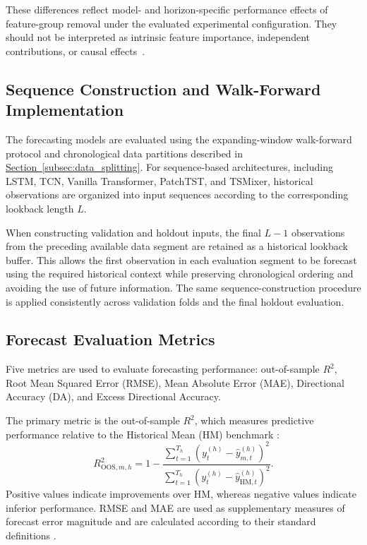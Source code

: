 \documentclass[runningheads,orivec]{llncs}
\begin{document}
These differences reflect model- and horizon-specific performance effects of feature-group removal under the evaluated experimental configuration. They should not be interpreted as intrinsic feature importance, independent contributions, or causal effects~\cite{hooker2021}.

\subsection{Sequence Construction and Walk-Forward Implementation}\label{subsec:walk_forward}

The forecasting models are evaluated using the expanding-window walk-forward protocol and chronological data partitions described in \hyperref[subsec:data_splitting]{Section~\ref*{subsec:data_splitting}}. For sequence-based architectures, including LSTM, TCN, Vanilla Transformer, PatchTST, and TSMixer, historical observations are organized into input sequences according to the corresponding lookback length $L$.

When constructing validation and holdout inputs, the final $L-1$ observations from the preceding available data segment are retained as a historical lookback buffer. This allows the first observation in each evaluation segment to be forecast using the required historical context while preserving chronological ordering and avoiding the use of future information. The same sequence-construction procedure is applied consistently across validation folds and the final holdout evaluation.

\subsection{Forecast Evaluation Metrics}\label{subsec:eval_metrics}

Five metrics are used to evaluate forecasting performance: out-of-sample $R^2$, Root Mean Squared Error (RMSE), Mean Absolute Error (MAE), Directional Accuracy (DA), and Excess Directional Accuracy.

The primary metric is the out-of-sample $R^2$, which measures predictive performance relative to the Historical Mean (HM) benchmark \cite{campbell2008}:
\begin{equation}\label{eq:oos_r2}
R^2_{\mathrm{OOS},m,h} = 1 - \frac{\sum_{t=1}^{T_h} (y_t^{(h)} - \hat{y}_{m,t}^{(h)})^2}{\sum_{t=1}^{T_h} (y_t^{(h)} - \hat{y}_{\mathrm{HM},t}^{(h)})^2}.
\end{equation}
Positive values indicate improvements over HM, whereas negative values indicate inferior performance. RMSE and MAE are used as supplementary measures of forecast error magnitude and are calculated according to their standard definitions \cite{hodson2022}.
\end{document}
